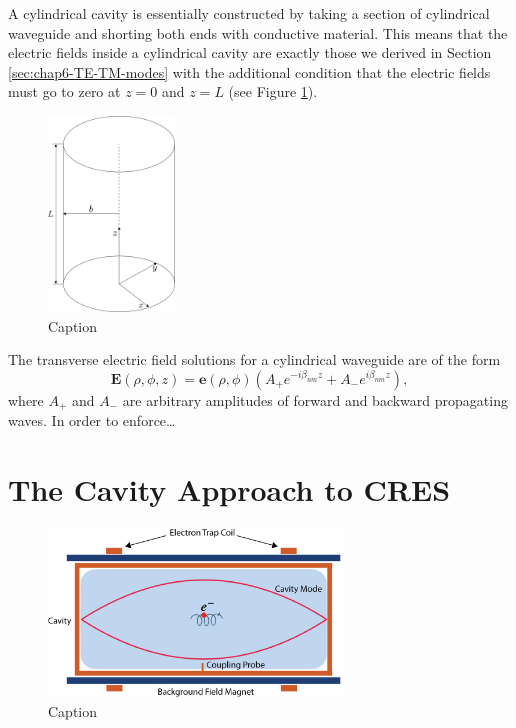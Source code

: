A cylindrical cavity is essentially constructed by taking a section of cylindrical waveguide and shorting both ends with conductive material. This means that the electric fields inside a cylindrical cavity are exactly those we derived in Section \ref{sec:chap6-TE-TM-modes} with the additional condition that the electric fields must go to zero at $z=0$ and $z=L$ (see Figure \ref{fig:chap6-cyl-cav}).
\begin{figure}[htbp]
    \centering
    \includegraphics*[width=0.3\textwidth]{figs/Chapter-6/230606_cylindrical_cavity.png}
    \caption{\label{fig:chap6-cyl-cav} Caption}
\end{figure}

The transverse electric field solutions for a cylindrical waveguide are of the form
\begin{equation}
    \bm{E}(\rho,\phi,z)=\bm{e}(\rho,\phi)\left(A_+e^{-i\beta_{nm}z}+A_-e^{i\beta_{nm}z }\right),
\end{equation}
where $A_+$ and $A_-$ are arbitrary amplitudes of forward and backward propagating waves. In order to enforce\ldots


\section{The Cavity Approach to CRES}
\label{sec:chap6-cavity-approach}

\begin{figure}[htbp]
    \centering
    \includegraphics*[width=0.7\textwidth]{figs/Chapter-6/230606_cavity_cartoon.png}
    \caption{\label{fig:chap6-cav-cartoon} Caption}
\end{figure}

